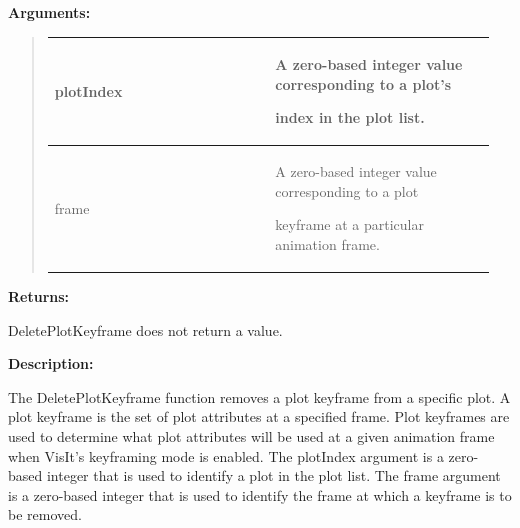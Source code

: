 \documentclass[letterpaper,10pt,english]{sphinxmanual}
\begin{document}
\begin{DUlineblock}{0em}
\item[] 
\item[] \textbf{Arguments:}
\end{DUlineblock}
\begin{quote}

\begin{tabular}{|p{0.475\linewidth}|p{0.475\linewidth}|}
\hline

plotIndex
 & 
\begin{DUlineblock}{0em}
\item[] A zero-based integer value corresponding to a plot's
\item[] index in the plot list.
\end{DUlineblock}
\\
\hline
frame
 & 
\begin{DUlineblock}{0em}
\item[] A zero-based integer value corresponding to a plot
\item[] keyframe at a particular animation frame.
\end{DUlineblock}
\\
\hline\end{tabular}

\end{quote}

\begin{DUlineblock}{0em}
\item[] 
\item[] \textbf{Returns:}
\item[] DeletePlotKeyframe does not return a value.
\item[] 
\item[] \textbf{Description:}
\item[] The DeletePlotKeyframe function removes a plot keyframe from a specific
plot. A plot keyframe is the set of plot attributes at a specified frame.
Plot keyframes are used to determine what plot attributes will be used at a
given animation frame when VisIt's keyframing mode is enabled. The
plotIndex argument is a zero-based integer that is used to identify a plot
in the plot list. The frame argument is a zero-based integer that is used
to identify the frame at which a keyframe is to be removed.
\end{DUlineblock}

\begin{DUlineblock}{0em}
\item[] 
\end{DUlineblock}
\end{document}
